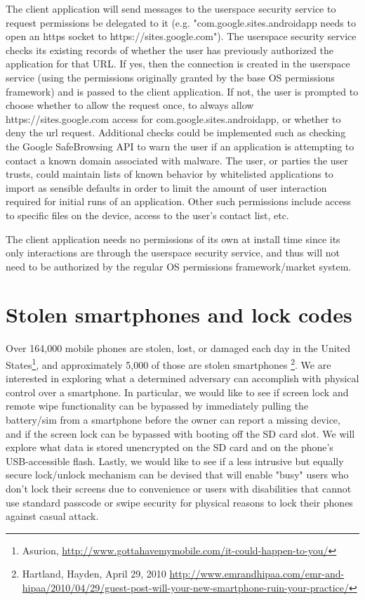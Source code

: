\documentclass[11pt]{article}
\begin{document}
The client application will send messages to the userspace security service to
request permissions be delegated to it (e.g. "com.google.sites.androidapp
needs to open an https socket to https://sites.google.com"). The userspace
security service checks its existing records of whether the user has
previously authorized the application for that URL. If yes, then the connection
is created in the userspace service (using the permissions originally granted
by the base OS permissions framework) and is passed to the client application.
If not, the user is prompted to choose whether to allow the request once, to
always allow https://sites.google.com access for com.google.sites.androidapp,
or whether to deny the url request. Additional checks could be implemented such
as checking the Google SafeBrowsing API to warn the user if an application is
attempting to contact a known domain associated with malware. The user, or
parties the user trusts, could maintain lists of known behavior by whitelisted
applications to import as sensible defaults in order to limit the amount of
user interaction required for initial runs of an application. Other such
permissions include access to specific files on the device, access to the
user's contact list, etc.

The client application needs no permissions of its own at install time since
its only interactions are through the userspace security service, and thus will
not need to be authorized by the regular OS permissions framework/market
system.

\section{Stolen smartphones and lock codes}
Over 164,000 mobile phones are stolen, lost, or damaged each day in the United
States\footnote{Asurion,
\url{http://www.gottahavemymobile.com/it-could-happen-to-you/}}, and
approximately 5,000 of those are stolen smartphones
\footnote{Hartland, Hayden, April 29, 2010
\url{http://www.emrandhipaa.com/emr-and-hipaa/2010/04/29/guest-post-will-your-new-smartphone-ruin-your-practice/}}.
We are interested in exploring what a determined adversary can accomplish with
physical control over a smartphone. In particular, we would like to see if
screen lock and remote wipe functionality can be bypassed by immediately
pulling the battery/sim from a smartphone before the owner can report a
missing device, and if the screen lock can be bypassed with booting off
the SD card slot. We will explore what data is stored unencrypted on the
SD card and on the phone's USB-accessible flash. Lastly, we would like to see
if a less intrusive but equally secure lock/unlock mechanism can be devised
that will enable "busy" users who don't lock their screens due to convenience
or users with disabilities that cannot use standard passcode or swipe security
for physical reasons to lock their phones against casual attack.
\end{document}
